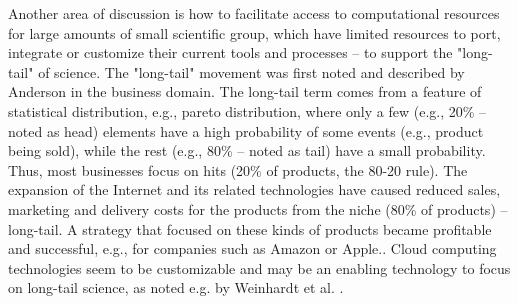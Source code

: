 Another area of discussion is how to facilitate access to computational resources for large amounts of small scientific group, which have limited resources to port, integrate or customize their current tools and processes -- to support the "long-tail" of science. The "long-tail" movement was first noted and described by Anderson \cite{Anderson2006} in the business domain. %
The long-tail term comes from a feature of statistical distribution, e.g., pareto distribution, where only a few (e.g., 20\% -- noted as head) elements have a high probability of some events (e.g., product being sold), while the rest (e.g., 80\% -- noted as tail) have a small probability. Thus, most businesses focus on hits (20\% of products, the 80-20 rule). The expansion of the Internet and its related technologies have caused reduced sales, marketing and delivery costs for the products from the niche (80\% of products) -- long-tail. A strategy that focused on these kinds of products became profitable and successful, e.g., for companies such as Amazon or Apple.\cite{Anderson2006}. 
Cloud computing technologies seem to be customizable and may be an enabling technology to focus on long-tail science, 
as noted e.g. by Weinhardt et al. \cite{Weinhardt2009}. 

